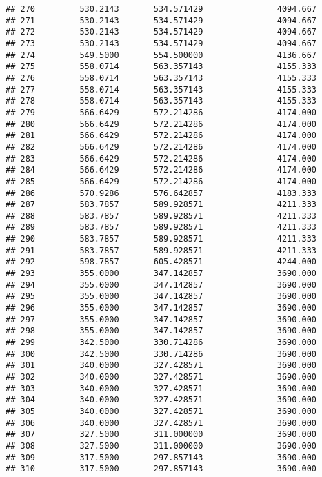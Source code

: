 \documentclass[]{article}
\begin{document}
\begin{verbatim}
## 270         530.2143       534.571429               4094.667
## 271         530.2143       534.571429               4094.667
## 272         530.2143       534.571429               4094.667
## 273         530.2143       534.571429               4094.667
## 274         549.5000       554.500000               4136.667
## 275         558.0714       563.357143               4155.333
## 276         558.0714       563.357143               4155.333
## 277         558.0714       563.357143               4155.333
## 278         558.0714       563.357143               4155.333
## 279         566.6429       572.214286               4174.000
## 280         566.6429       572.214286               4174.000
## 281         566.6429       572.214286               4174.000
## 282         566.6429       572.214286               4174.000
## 283         566.6429       572.214286               4174.000
## 284         566.6429       572.214286               4174.000
## 285         566.6429       572.214286               4174.000
## 286         570.9286       576.642857               4183.333
## 287         583.7857       589.928571               4211.333
## 288         583.7857       589.928571               4211.333
## 289         583.7857       589.928571               4211.333
## 290         583.7857       589.928571               4211.333
## 291         583.7857       589.928571               4211.333
## 292         598.7857       605.428571               4244.000
## 293         355.0000       347.142857               3690.000
## 294         355.0000       347.142857               3690.000
## 295         355.0000       347.142857               3690.000
## 296         355.0000       347.142857               3690.000
## 297         355.0000       347.142857               3690.000
## 298         355.0000       347.142857               3690.000
## 299         342.5000       330.714286               3690.000
## 300         342.5000       330.714286               3690.000
## 301         340.0000       327.428571               3690.000
## 302         340.0000       327.428571               3690.000
## 303         340.0000       327.428571               3690.000
## 304         340.0000       327.428571               3690.000
## 305         340.0000       327.428571               3690.000
## 306         340.0000       327.428571               3690.000
## 307         327.5000       311.000000               3690.000
## 308         327.5000       311.000000               3690.000
## 309         317.5000       297.857143               3690.000
## 310         317.5000       297.857143               3690.000

\end{verbatim}
\end{document}
